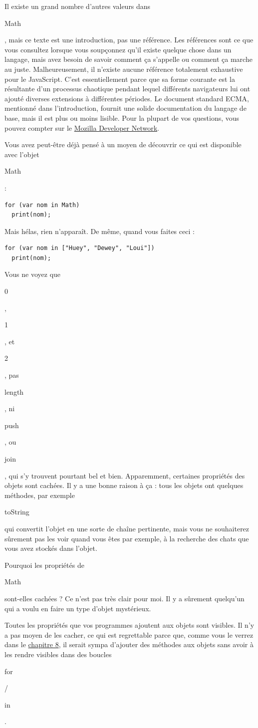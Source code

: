 \documentclass{FramateX}
\renewcommand{\texttt}[1]{\begin{sffamily}{#1}\end{sffamily}}
\begin{document}
Il existe un grand nombre d'autres valeurs dans \texttt{Math}, mais ce
texte est une introduction, pas une référence. Les références sont ce
que vous consultez lorsque vous soupçonnez qu'il existe quelque chose
dans un langage, mais avez besoin de savoir comment ça s'appelle ou
comment ça marche au juste. Malheureusement, il n'existe aucune
référence totalement exhaustive pour le JavaScript. C'est
essentiellement parce que sa forme courante est la résultante d'un
processus chaotique pendant lequel différents navigateurs lui ont ajouté
diverses extensions à différentes périodes. Le document standard ECMA,
mentionné dans l'introduction, fournit une solide documentation du
langage de base, mais il est plus ou moins lisible. Pour la plupart de
vos questions, vous pouvez compter sur le
\href{https://developer.mozilla.org/fr/JavaScript/}{Mozilla Developer
Network}.

\begin{center}\end{center}

Vous avez peut-être déjà pensé à un moyen de découvrir ce qui est
disponible avec l'objet \texttt{Math} :

\begin{lstlisting}
for (var nom in Math)
  print(nom);
\end{lstlisting}
Mais hélas, rien n'apparaît. De même, quand vous faites ceci :

\begin{lstlisting}
for (var nom in ["Huey", "Dewey", "Loui"])
  print(nom);
\end{lstlisting}
Vous ne voyez que \texttt{0}, \texttt{1}, et \texttt{2}, pas
\texttt{length}, ni \texttt{push}, ou \texttt{join}, qui s'y trouvent
pourtant bel et bien. Apparemment, certaines propriétés des objets sont
cachées. Il y a une bonne raison à ça : tous les objets ont quelques
méthodes, par exemple \texttt{toString} qui convertit l'objet en une
sorte de chaîne pertinente, mais vous ne souhaiterez sûrement pas les
voir quand vous êtes par exemple, à la recherche des chats que vous avez
stockés dans l'objet.

Pourquoi les propriétés de \texttt{Math} sont-elles cachées ? Ce n'est
pas très clair pour moi. Il y a sûrement quelqu'un qui a voulu en faire
un type d'objet mystérieux.

Toutes les propriétés que vos programmes ajoutent aux objets sont
visibles. Il n'y a pas moyen de les cacher, ce qui est regrettable parce
que, comme vous le verrez dans le \href{chapter8.html}{chapitre 8}, il
serait sympa d'ajouter des méthodes aux objets sans avoir à les rendre
visibles dans des boucles \texttt{for}/\texttt{in}.
\end{document}
